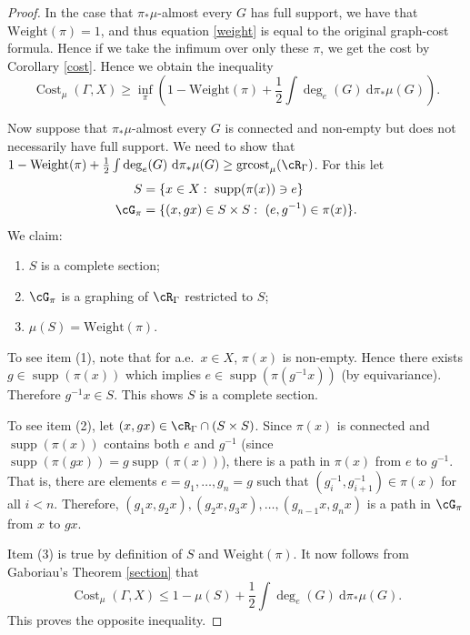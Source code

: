 \documentclass[12pt]{article}
\theoremstyle{plain}
\theoremstyle{definition}
\theoremstyle{remark}
\newcommand{\G}{\Gamma}
\newcommand\cost{{\operatorname{Cost}}}
\newcommand\supp{\operatorname{supp}}
\newcommand{\dee}{\textrm{d}}
\begin{document}
\begin{proof}
    In the case that $\pi_*\mu$-almost every $G$ has full support, we have that $\text{Weight}(\pi) = 1$, and thus equation \ref{weight} is equal to the original graph-cost formula. Hence if we take the infimum over only these $\pi$, we get the cost by Corollary \ref{cost}. Hence we obtain the inequality
    $$    \cost_\mu(\G,X) \ge \inf_\pi \left(1- \text{Weight}(\pi)+ \frac{1}{2}\int \deg_e(G)~\dee \pi_*\mu(G)\right).$$

    

    Now suppose that $\pi_*\mu$-almost every $G$ is connected and non-empty but does not necessarily have full support. We need to show that $1- \text{Weight}(\pi)+ \frac{1}{2}\int \deg_e(G)~\dee \pi_*\mu(G) \geq \operatorname{grcost}_\mu(\cR_\G)$. For this let
    \begin{align*}
        S &= \{x\in X:~ \supp(\pi(x))\ni e\}\\
        \cG_\pi&=\{(x,gx) \in S \times S:~(e,g^{-1})\in \pi(x)\}.
    \end{align*}
We claim:
\begin{enumerate}
    \item $S$ is a complete section;
    \item $\cG_\pi$ is a graphing of $\cR_\G$ restricted to $S$;
    \item $\mu(S)=\text{Weight}(\pi)$.
\end{enumerate}
To see item (1), note that for a.e.\ $x\in X$, $\pi(x)$ is non-empty. Hence there exists $g\in \supp(\pi(x))$ which implies $e \in \supp(\pi(g^{-1}x))$ (by equivariance). Therefore $g^{-1}x \in S$. This shows $S$ is a complete section.

To see item (2), let $(x,gx)\in \cR_\G \cap (S\times S)$. Since $\pi(x)$ is connected and $\supp(\pi(x))$ contains both $e$ and $g^{-1}$ (since $\supp(\pi(gx))=g\supp(\pi(x))$), there is a path in $\pi(x)$ from $e$ to $g^{-1}$. That is, there are elements $e=g_1,\ldots, g_n=g$ such that $(g_i^{-1},g_{i+1}^{-1})\in \pi(x)$ for all $i<n$. Therefore, $(g_1x,g_2x), (g_2x,g_3x),\ldots, (g_{n-1}x,g_nx)$ is a path in $\cG_\pi$ from $x$ to $gx$. 

Item (3) is true by definition of $S$ and $\text{Weight}(\pi)$. It now follows from Gaboriau's Theorem \ref{section} that
   $$    \cost_\mu(\G,X) \le     1- \mu(S)+ \frac{1}{2}\int \deg_e(G)~\dee \pi_*\mu(G).$$
This proves the opposite inequality.
\end{proof}
\end{document}

